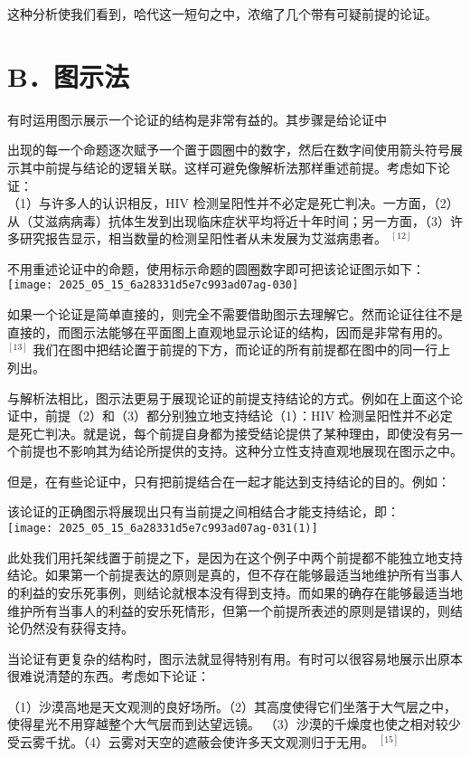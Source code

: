 这种分析使我们看到，哈代这一短句之中，浓缩了几个带有可疑前提的论证。

\section*{B．图示法}
有时运用图示展示一个论证的结构是非常有益的。其步骤是给论证中

出现的每一个命题逐次赋予一个置于圆圈中的数字，然后在数字间使用箭头符号展示其中前提与结论的逻辑关联。这样可避免像解析法那样重述前提。考虑如下论证：\\
（1）与许多人的认识相反，HIV 检测呈阳性并不必定是死亡判决。一方面，（2）从（艾滋病病毒）抗体生发到出现临床症状平均将近十年时间；另一方面，（3）许多研究报告显示，相当数量的检测呈阳性者从未发展为艾滋病患者。 ${}^{[12]}$

不用重述论证中的命题，使用标示命题的圆圈数字即可把该论证图示如下：\\
\texttt{[image: 2025\_05\_15\_6a28331d5e7c993ad07ag-030]}

如果一个论证是简单直接的，则完全不需要借助图示去理解它。然而论证往往不是直接的，而图示法能够在平面图上直观地显示论证的结构，因而是非常有用的。 ${ }^{[13]}$ 我们在图中把结论置于前提的下方，而论证的所有前提都在图中的同一行上列出。

与解析法相比，图示法更易于展现论证的前提支持结论的方式。例如在上面这个论证中，前提（2）和（3）都分别独立地支持结论（1）：HIV 检测呈阳性并不必定是死亡判决。就是说，每个前提自身都为接受结论提供了某种理由，即使没有另一个前提也不影响其为结论所提供的支持。这种分立性支持直观地展现在图示之中。

但是，在有些论证中，只有把前提结合在一起才能达到支持结论的目的。例如：

该论证的正确图示将展现出只有当前提之间相结合才能支持结论，即：\\
\texttt{[image: 2025\_05\_15\_6a28331d5e7c993ad07ag-031(1)]}

此处我们用托架线置于前提之下，是因为在这个例子中两个前提都不能独立地支持结论。如果第一个前提表达的原则是真的，但不存在能够最适当地维护所有当事人的利益的安乐死事例，则结论就根本没有得到支持。而如果的确存在能够最适当地维护所有当事人的利益的安乐死情形，但第一个前提所表述的原则是错误的，则结论仍然没有获得支持。

当论证有更复杂的结构时，图示法就显得特别有用。有时可以很容易地展示出原本很难说清楚的东西。考虑如下论证：

\begin{displayquote}
（1）沙漠高地是天文观测的良好场所。（2）其高度使得它们坐落于大气层之中，使得星光不用穿越整个大气层而到达望远镜。 （3）沙漠的千燥度也使之相对较少受云雾千扰。（4）云雾对天空的遮蔽会使许多天文观测归于无用。 ${}^{[15]}$
\end{displayquote}

